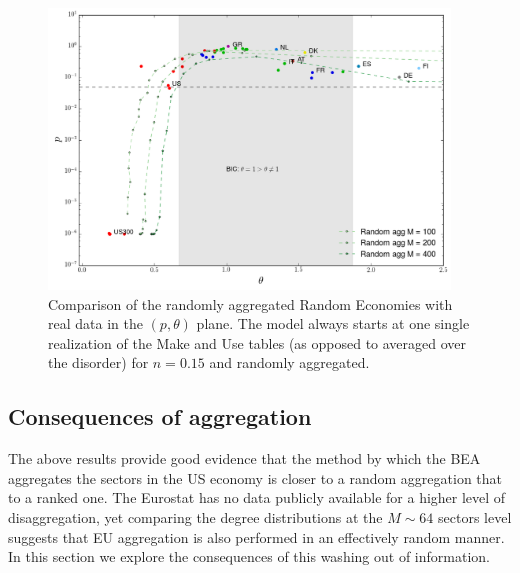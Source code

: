 \begin{figure}[!ht]
  \centering
  \includegraphics[width=0.95\textwidth]{figs_io/theta_pval_model_agg.png}
  \caption{Comparison of the randomly aggregated Random Economies with real data in the
    $(p, \theta)$ plane. The model always starts at one single
    realization of the Make and Use tables (as opposed to averaged
    over the disorder) for $n=0.15$ and randomly aggregated.}
  \label{fig:theta_pval_model_agg}
\end{figure}


\subsection{Consequences of aggregation}

The above results provide good evidence that the method by which the
BEA aggregates the sectors in the US economy is closer to a random
aggregation that to a ranked one. The Eurostat has no data publicly
available for a higher level of disaggregation, yet comparing the
degree distributions at the $M\sim 64$ sectors level suggests that EU
aggregation is also performed in an effectively random manner. In this
section we explore the consequences of this washing out of
information.

